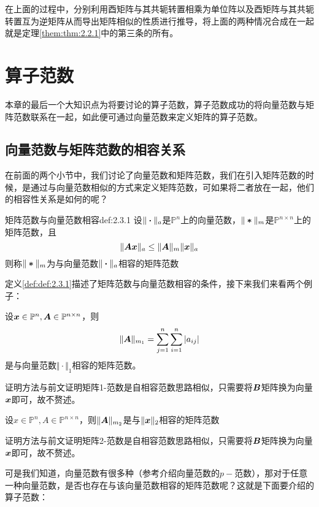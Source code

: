\documentclass[12pt, a4paper, oneside, UTF8]{ctexbook}
\begin{document}
在上面的过程中，分别利用酉矩阵与其共轭转置相乘为单位阵以及酉矩阵与其共轭转置互为逆矩阵从而导出矩阵相似的性质进行推导，将上面的两种情况合成在一起就是定理\ref{them:thm:2.2.1}中的第三条的所有。

\section{算子范数}
本章的最后一个大知识点为将要讨论的算子范数，算子范数成功的将向量范数与矩阵范数联系在一起，如此便可通过向量范数来定义矩阵的算子范数。
\subsection{向量范数与矩阵范数的相容关系}

在前面的两个小节中，我们讨论了向量范数和矩阵范数，我们在引入矩阵范数的时候，是通过与向量范数相似的方式来定义矩阵范数，可如果将二者放在一起，他们的相容性关系是如何的呢？

\begin{defn}{矩阵范数与向量范数相容}{def:2.3.1}
    设$\Vert\boldsymbol{\cdot}\Vert_{a}$是$\mathbb{P}^n$上的向量范数，$\Vert\boldsymbol{*}\Vert_m$是$\mathbb{P}^{n\times n}$上的矩阵范数，且\[\Vert\boldsymbol{Ax}\Vert_a\leq \Vert\boldsymbol{A}\Vert_m\Vert\boldsymbol{x}\Vert_a\]
    则称$\Vert\boldsymbol{*}\Vert_m$为与向量范数$\Vert\boldsymbol{\cdot}\Vert_a$相容的矩阵范数
\end{defn}

定义\ref{def:def:2.3.1}描述了矩阵范数与向量范数相容的条件，接下来我们来看两个例子：
\begin{example}
    设$\boldsymbol{x}\in \mathbb{P}^n, \boldsymbol{A}\in\mathbb{P}^{n\times n}$，则\[\Vert\boldsymbol{A}\Vert_{m_1}=\sum_{j=1}^{n}\sum_{i=1}^{n}|a_{ij}|\]是与向量范数$\Vert\cdot\Vert_1$相容的矩阵范数。
\end{example}
\begin{solution}
    证明方法与前文证明矩阵1-范数是自相容范数思路相似，只需要将$\boldsymbol{B}$矩阵换为向量$\boldsymbol{x}$即可，故不赘述。
\end{solution}

\begin{example}
    设$x\in\mathbb{P}^n, A\in \mathbb{P}^{n\times n}$，则$\Vert\boldsymbol{A}\Vert_{m_2}$是与$\Vert\boldsymbol{x}\Vert_2$相容的矩阵范数
\end{example}
\begin{solution}
    证明方法与前文证明矩阵2-范数是自相容范数思路相似，只需要将$\boldsymbol{B}$矩阵换为向量$\boldsymbol{x}$即可，故不赘述。
\end{solution}


可是我们知道，向量范数有很多种（参考介绍向量范数的$p-$范数），那对于任意一种向量范数，是否也存在与该向量范数相容的矩阵范数呢？这就是下面要介绍的算子范数：
\end{document}
